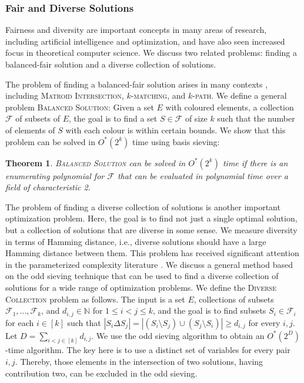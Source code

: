 \documentclass[10pt,a4paper]{article}
\newtheorem{theorem}{Theorem}[section]
\newcommand{\N}{\ensuremath{\mathbb N}\xspace}
\newcommand{\cF}{\ensuremath{\mathcal F}\xspace}
\begin{document}
\subsubsection{Fair and Diverse Solutions}

Fairness and diversity are important concepts in many areas of research, including artificial intelligence and optimization,
and have also seen increased focus in theoretical computer science.
We discuss two related problems: finding a balanced-fair solution and a diverse collection of solutions.

The problem of finding a balanced-fair solution arises in many contexts \cite{BandyapadhyayFIS23,BentertKN23,Chierichetti0LV17,Chierichetti0LV19}, including \textsc{Matroid Intersection}, \textsc{$k$-matching}, and \textsc{$k$-path}.
We define a general problem \textsc{Balanced Solution}:
Given a set $E$ with coloured elements, a collection $\mathcal{F}$ of subsets of $E$, the goal is to find a set $S \in \mathcal{F}$ of size $k$ such that the number of elements of $S$ with each colour is within certain bounds.
We show that this problem can be solved in $O^*(2^k)$ time using basis sieving:

\begin{theorem}
  \textsc{Balanced Solution} can be solved in $O^*(2^k)$ time if there is an enumerating polynomial for $\cF$ that can be evaluated in polynomial time over a field of characteristic 2.
\end{theorem}

The problem of finding a diverse collection of solutions is another important optimization problem.
Here, the goal is to find not just a single optimal solution, but a collection of solutions that are diverse in some sense.
We measure diversity in terms of Hamming distance, i.e., diverse solutions should have a large Hamming distance between them.
This problem has received significant attention in the parameterized complexity literature \cite{BasteFJMOPR22,BasteJMPR19,FominGJPS24,FominGPPS24,HanakaKKO21}.
We discuss a general method based on the odd sieving technique that can be used to find a diverse collection of solutions for a wide range of optimization problems.
We define the \textsc{Diverse Collection} problem as follows.
The input is a set $E$, collections of subsets $\cF_1, \dots, \cF_k$, and $d_{i,j} \in \N$ for $1 \leq i < j \leq k$, and the goal is to find subsets $S_i \in \cF_i$ for each $i \in [k]$ such that $|S_i \Delta S_j| = |(S_i \setminus S_j) \cup (S_j \setminus S_i)| \ge d_{i,j}$ for every $i, j$.
Let $D =  \sum_{i < j \in [k]} d_{i,j}$.
We use the odd sieving algorithm to obtain an $O^*(2^D)$-time algorithm.
The key here is to use a distinct set of variables for every pair $i,j$. 
Thereby, those elements in the intersection of two solutions, having contribution two, can be excluded in the odd sieving.
\end{document}

